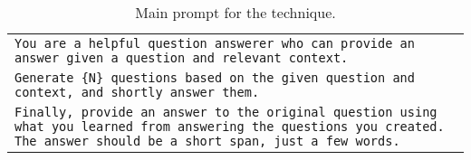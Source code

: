 \begin{table*}[ht]
    \caption{Main prompt for the \rephrase{} technique. 
    }
    \centering
    \small
    \begin{tabular}{>{\raggedright\arraybackslash\tt}p{}<{}}
      \toprule
      You are a helpful question answerer who can provide an answer given a question and relevant context.\\
      Generate \{N\} questions based on the given question and context, and shortly answer them.\\
      Finally, provide an answer to the original question using what you learned from answering the questions you created.
      The answer should be a short span, just a few words. \\
      \bottomrule
    \end{tabular}
    \label{tab:square_prompt}
\end{table*}
